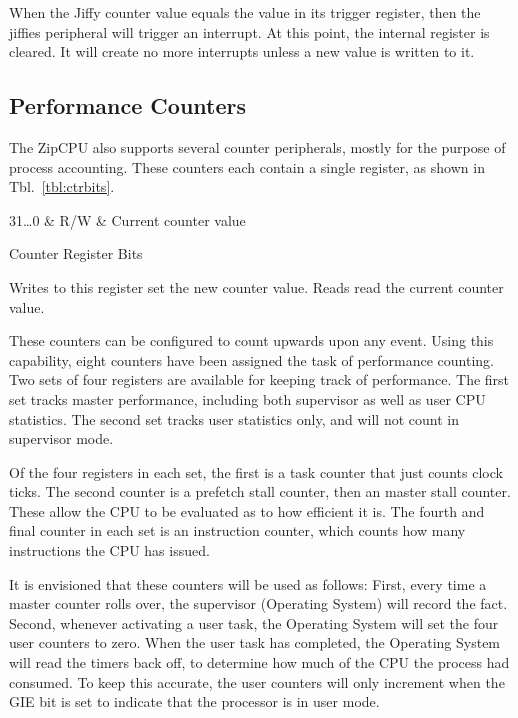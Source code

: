 \documentclass{gqtekspec}
\begin{document}
When the Jiffy counter value equals the value in its trigger register, then
the jiffies peripheral will trigger an interrupt.  At this point, the internal
register is cleared.  It will create no more interrupts unless a new value
is written to it.

\subsection{Performance Counters}

The ZipCPU also supports several counter peripherals, mostly for the purpose of
process accounting.  These counters each contain a single register, as shown
in Tbl.~\ref{tbl:ctrbits}.
\begin{table}\begin{center}
\begin{bitlist}
31\ldots 0 & R/W & Current counter value\\\hline
\end{bitlist}
\caption{Counter Register Bits}\label{tbl:ctrbits}
\end{center}\end{table}
Writes to this register set the new counter value.  Reads read the current
counter value.  

These counters can be configured to count upwards upon any event.  Using this
capability, eight counters have been assigned the task of performance counting.
Two sets of four registers are available for keeping track of performance.
The first set tracks master performance, including both supervisor as well as
user CPU statistics.  The second set tracks user statistics only, and will not
count in supervisor mode.

Of the four registers in each set, the first is a task counter that just counts
clock ticks.  The second counter is a prefetch stall counter, then an master
stall counter.  These allow the CPU to be evaluated as to how efficient it is. 
The fourth and final counter in each set is an instruction counter, which
counts how many instructions the CPU has issued.

It is envisioned that these counters will be used as follows: First, every time
a master counter rolls over, the supervisor (Operating System) will record
the fact.  Second, whenever activating a user task, the Operating System will
set the four user counters to zero.  When the user task has completed, the
Operating System will read the timers back off, to determine how much of the
CPU the process had consumed.  To keep this accurate, the user counters will
only increment when the GIE bit is set to indicate that the processor is
in user mode.
\end{document}
